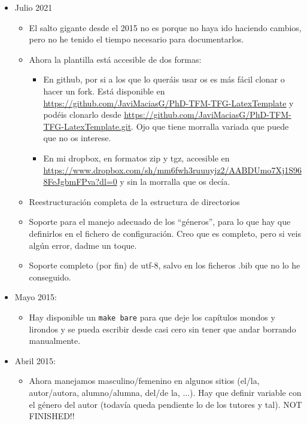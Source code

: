 \begin{itemize}

  
\item Julio 2021
  \begin{itemize}
    
  \item El salto gigante desde el 2015 no es porque no haya ido
    haciendo cambios, pero no he tenido el tiempo necesario para
    documentarlos.
    
  \item Ahora la plantilla está accesible de dos formas:
    \begin{itemize}
    
    \item En github, por si a los que lo queráis usar os es más fácil
      clonar o hacer un fork. Está disponible en
      \url{https://github.com/JaviMaciasG/PhD-TFM-TFG-LatexTemplate} y
      podéis clonarlo desde
      \url{https://github.com/JaviMaciasG/PhD-TFM-TFG-LatexTemplate.git}. Ojo
      que tiene morralla variada que puede que no os interese.
    \item En mi dropbox, en formatos zip y tgz, accesible en
      \url{https://www.dropbox.com/sh/mm6fwh3ruuuyjz2/AABDUmo7Xj1S968FeJgbmFPva?dl=0}
      y sin la morralla que os decía.
      
    \end{itemize}
    
  \item Reestructuración completa de la estructura de directorios
  \item Soporte para el manejo adecuado de los ``géneros'', para lo
    que hay que definirlos en el fichero de configuración. Creo que es
    completo, pero si veis algún error, dadme un toque.
  \item Soporte completo (por fin) de utf-8, salvo en los ficheros
    .bib que no lo he conseguido.    
  \end{itemize}
  
\item Mayo 2015:
  \begin{itemize}
  \item Hay disponible un \texttt{make bare} para que deje los capítulos
    mondos y lirondos y se pueda escribir desde casi cero sin tener que
    andar borrando manualmente.
  \end{itemize}


\item Abril 2015:
  \begin{itemize}
  \item Ahora manejamos masculino/femenino en algunos sitios (el/la,
    autor/autora, alumno/alumna, del/de la, ...). Hay que definir
    variable con el género del autor (todavía queda pendiente lo de los
    tutores y tal). NOT FINISHED!!
  \end{itemize}



\end{itemize}
